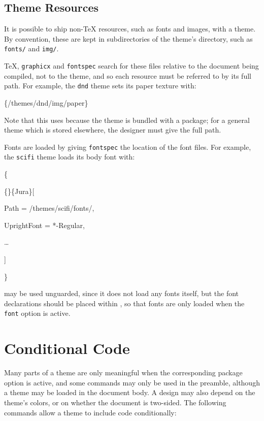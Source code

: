 		\subsection{Theme Resources}\label{S:ThemeResources}

			It is possible to ship non-\TeX{} resources, such as fonts and images, with a theme. By convention, these are kept in subdirectories of the theme's directory, such as \texttt{fonts/} and \texttt{img/}.

			\TeX{}, \texttt{graphicx} and \texttt{fontspec} search for these files relative to the document being compiled, not to the theme, and so each resource must be referred to by its full path. For example, the \texttt{dnd} theme sets its paper texture with:
			\begin{Code}
				\{/themes/dnd/img/paper\}
			\end{Code}

			Note that this uses  because the theme is bundled with a package; for a general theme which is stored elsewhere, the designer must give the full path.

			Fonts are loaded by giving \texttt{fontspec} the location of the font files. For example, the \texttt{scifi} theme loads its body font with:
			\begin{Code}
				\cmd*{RpgIfFont}\{

				\quad{}\{\}\{Jura\}[

				\quad\quad Path = /themes/scifi/fonts/,

				\quad\quad UprightFont = *-Regular,

				\quad\quad \ldots

				\quad]

				\}
			\end{Code}
			 may be used unguarded, since it does not load any fonts itself, but the font declarations should be placed within , so that fonts are only loaded when the \texttt{font} option is active.

	\section{Conditional Code}\label{S:ThemeConditional}

		Many parts of a theme are only meaningful when the corresponding package option is active, and some commands may only be used in the preamble, although a theme may be loaded in the document body. A design may also depend on the theme's colors, or on whether the document is two-sided. The following commands allow a theme to include code conditionally:

